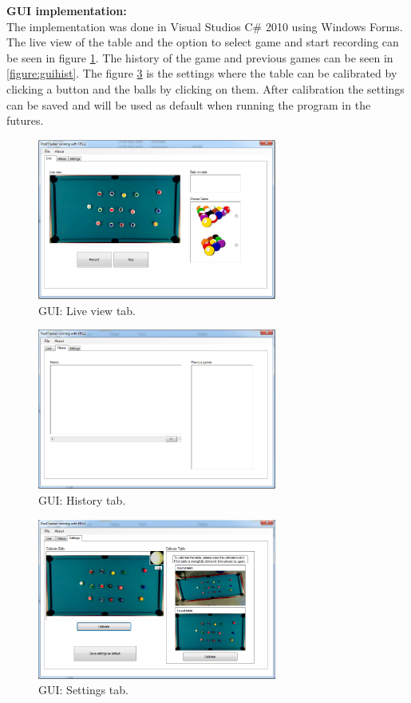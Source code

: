 \textbf{GUI implementation:}\\
The implementation was done in Visual Studios C\# 2010 using Windows Forms. The live view of the table and the option to select game and start recording can be seen in figure \ref{fig:guilive}. The history of the game and previous games can be seen in \ref{figure:guihist}. The figure \ref{fig:guisett} is the settings where the table can be calibrated by clicking a button and the balls by clicking on them. After calibration the settings can be saved and will be used as default when running the program in the futures.

\begin{figure}[H]
\begin{center}
\leavevmode
\includegraphics[width=0.7\textwidth]{images/prototype/live}
\end{center}
\caption{GUI: Live view tab.}
\label{fig:guilive}
\end{figure}

\begin{figure}[H]
\begin{center}
\leavevmode
\includegraphics[width=0.7\textwidth]{images/prototype/hist}
\end{center}
\caption{GUI: History tab.}
\label{fig:guihist}
\end{figure}

\begin{figure}[H]
\begin{center}
\leavevmode
\includegraphics[width=0.7\textwidth]{images/prototype/settings}
\end{center}
\caption{GUI: Settings tab.}
\label{fig:guisett}
\end{figure}